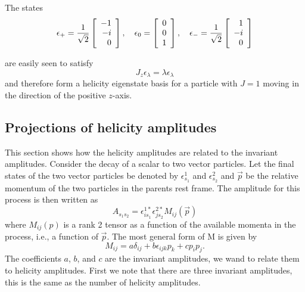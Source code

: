 The states
\begin{equation}
\epsilon_+={1\over\sqrt{2}}\left[\begin{array}{r}
          -1  \\
          -i  \\
          0  \\
          \end{array}\right],\quad
\epsilon_0=\left[\begin{array}{r}
          0  \\
          0  \\
          1  \\
          \end{array}\right],\quad
\epsilon_-={1\over\sqrt{2}}\left[\begin{array}{r}
          1  \\
          -i  \\
          0  \\
          \end{array}\right]
\label{eq:spinonestates}
\end{equation}

are easily seen to satisfy 
\begin{equation}
J_z\epsilon_{\lambda}=\lambda\epsilon_{\lambda}
\end{equation}
and therefore form a helicity eigenstate basis for a particle
with $J=1$ moving in the direction of the positive $z$-axis.

\subsection{Projections of helicity amplitudes}

This section shows how the helicity amplitudes are related to the
invariant amplitudes. Consider the decay of a scalar to two
vector particles. Let the final states of the two vector particles
be denoted by $\epsilon^1_{s_1}$ and $\epsilon^2_{s_2}$ and $\vec p$
be the relative momentum of the two particles in the parents
rest frame. The amplitude for this process is then written as
\begin{equation}
A_{s_1s_2}=\epsilon^{1*}_{is_1}\epsilon^{2*}_{js_2}M_{ij}(\vec p)
\end{equation}
where $M_{ij}(p)$ is a rank 2 tensor as a function of the available
momenta in the process, i.e., a function of $\vec p$. The most
general form of M is given by
\begin{equation}
M_{ij}=a\delta_{ij}+b\epsilon_{ijk}p_k+cp_ip_j.
\end{equation}
The coefficients $a$, $b$, and $c$ are the invariant amplitudes, we 
wand to relate them to helicity amplitudes. First we note that there
are three invariant amplitudes, this is the same as the number of 
helicity amplitudes. 

